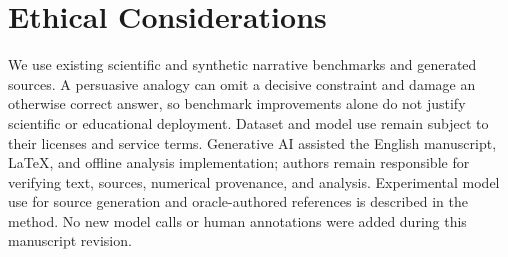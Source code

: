 \section*{Ethical Considerations}
We use existing scientific and synthetic narrative benchmarks and generated sources. A persuasive analogy can omit a decisive constraint and damage an otherwise correct answer, so benchmark improvements alone do not justify scientific or educational deployment. Dataset and model use remain subject to their licenses and service terms. Generative AI assisted the English manuscript, LaTeX, and offline analysis implementation; authors remain responsible for verifying text, sources, numerical provenance, and analysis. Experimental model use for source generation and oracle-authored references is described in the method. No new model calls or human annotations were added during this manuscript revision.
